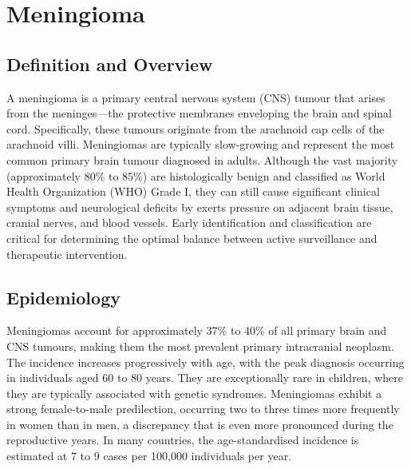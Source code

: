 \chapter{Meningioma}

\section*{Definition and Overview}
A meningioma is a primary central nervous system (CNS) tumour that arises from the meninges—the protective membranes enveloping the brain and spinal cord. Specifically, these tumours originate from the arachnoid cap cells of the arachnoid villi. Meningiomas are typically slow-growing and represent the most common primary brain tumour diagnosed in adults. Although the vast majority (approximately 80\% to 85\%) are histologically benign and classified as World Health Organization (WHO) Grade I, they can still cause significant clinical symptoms and neurological deficits by exerts pressure on adjacent brain tissue, cranial nerves, and blood vessels. Early identification and classification are critical for determining the optimal balance between active surveillance and therapeutic intervention.

\section*{Epidemiology}
Meningiomas account for approximately 37\% to 40\% of all primary brain and CNS tumours, making them the most prevalent primary intracranial neoplasm. The incidence increases progressively with age, with the peak diagnosis occurring in individuals aged 60 to 80 years. They are exceptionally rare in children, where they are typically associated with genetic syndromes. Meningiomas exhibit a strong female-to-male predilection, occurring two to three times more frequently in women than in men, a discrepancy that is even more pronounced during the reproductive years. In many countries, the age-standardised incidence is estimated at 7 to 9 cases per 100,000 individuals per year.

